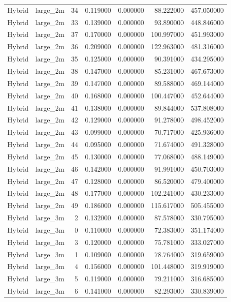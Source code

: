 \begin{tabular}{llrrrrr}
Hybrid & large_2m & 34 & 0.119000 & 0.000000 & 88.222000 & 457.050000 \\
Hybrid & large_2m & 33 & 0.139000 & 0.000000 & 93.890000 & 448.846000 \\
Hybrid & large_2m & 37 & 0.170000 & 0.000000 & 100.997000 & 451.993000 \\
Hybrid & large_2m & 36 & 0.209000 & 0.000000 & 122.963000 & 481.316000 \\
Hybrid & large_2m & 35 & 0.125000 & 0.000000 & 90.391000 & 434.295000 \\
Hybrid & large_2m & 38 & 0.147000 & 0.000000 & 85.231000 & 467.673000 \\
Hybrid & large_2m & 39 & 0.147000 & 0.000000 & 89.588000 & 469.144000 \\
Hybrid & large_2m & 40 & 0.168000 & 0.000000 & 100.447000 & 452.644000 \\
Hybrid & large_2m & 41 & 0.138000 & 0.000000 & 89.844000 & 537.808000 \\
Hybrid & large_2m & 42 & 0.129000 & 0.000000 & 91.278000 & 498.452000 \\
Hybrid & large_2m & 43 & 0.099000 & 0.000000 & 70.717000 & 425.936000 \\
Hybrid & large_2m & 44 & 0.095000 & 0.000000 & 71.674000 & 491.328000 \\
Hybrid & large_2m & 45 & 0.130000 & 0.000000 & 77.068000 & 488.149000 \\
Hybrid & large_2m & 46 & 0.142000 & 0.000000 & 91.991000 & 450.703000 \\
Hybrid & large_2m & 47 & 0.128000 & 0.000000 & 86.520000 & 479.400000 \\
Hybrid & large_2m & 48 & 0.177000 & 0.000000 & 102.241000 & 430.233000 \\
Hybrid & large_2m & 49 & 0.186000 & 0.000000 & 115.617000 & 505.455000 \\
Hybrid & large_3m & 2 & 0.132000 & 0.000000 & 87.578000 & 330.795000 \\
Hybrid & large_3m & 0 & 0.110000 & 0.000000 & 72.383000 & 351.174000 \\
Hybrid & large_3m & 3 & 0.120000 & 0.000000 & 75.781000 & 333.027000 \\
Hybrid & large_3m & 1 & 0.109000 & 0.000000 & 78.764000 & 319.659000 \\
Hybrid & large_3m & 4 & 0.156000 & 0.000000 & 101.448000 & 319.919000 \\
Hybrid & large_3m & 5 & 0.119000 & 0.000000 & 79.211000 & 316.685000 \\
Hybrid & large_3m & 6 & 0.141000 & 0.000000 & 82.293000 & 330.839000 \\

\end{tabular}

